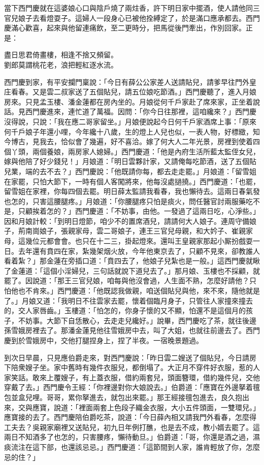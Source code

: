 當下西門慶就在這婆娘心口與陰戶燒了兩炷香，許下明日家中擺酒，使人請他同三官兒娘子去看燈耍子。這婦人一段身心已被他拴縛定了，於是滿口應承都去。西門慶滿心歡喜，起來與他留連痛飲，至二更時分，把馬從後門牽出，作別回家。正是：

\begin{myquote}
盡日思君倚畫樓，相逢不捨又頻留。\\劉郎莫謂桃花老，浪把輕紅逐水流。
\end{myquote}

西門慶到家，有平安攔門稟說：「今日有薛公公家差人送請貼兒，請爹早往門外皇庄看春。又是雲二叔家送了五個貼兒，請五位娘吃節酒。」西門慶聽了，進入月娘房來。只見孟玉樓、潘金蓮都在房內坐的。月娘從何千戶家赴了席來家，正坐着說話。見西門慶進來，連忙道了萬福。因問：「你今日往那裡，這咱纔來？」西門慶沒得說，只說：「我在應二哥家留坐。」月娘便說起今日何千戶家酒席上事：「原來何千戶娘子年還小哩，今年纔十八歲，生的燈上人兒也似，一表人物，好標緻，知今博古，見我去，恰似會了幾遍，好不喜洽。嫁了何大人二年光景，房裡到使着四個丫頭，兩個養娘，兩房家人媳婦。」西門慶道：「他是內府生活所藍太監侄女兒，嫁與他陪了好少錢兒！」月娘道：「明日雲夥計家，又請俺每吃節酒，送了五個貼兒業，端的去不去？」西門慶說：「他既請你每，都去走走罷。」月娘道：「留雪姐在家罷，只怕大節下，一時有個人客闖將來，他每沒處撾撓。」西門慶道：「也罷，留雪姐在家裡，你每四個去罷。明日薛太監請我看春，我也懶待去。這兩日春氣發也怎的，只害這腰腿疼。」月娘道：「你腰腿疼只怕是痰火，問任醫官討兩服藥吃不是，只顧挨着怎的？」西門慶道：「不妨事，由他。一發過了這兩日吃，心淨些。」因和月娘計較：「到明日燈節，咱少不的置席酒兒，請請何大人娘子。連周守備娘子，荊南崗娘子，張親家母，雲二哥娘子，連王三官兒母親，和大妗子、崔親家母，這幾位元都會會。也只在十二三，掛起燈來。還叫王皇親家那起小厮扮戲耍一日。去年還有賁四在家，紮幾架烟火放，今年他東京去了，只顧不見來，卻教誰人看着紮？」那金蓮在旁插口道：「賁四去了，他娘子兒紮也是一般。」{}這西門慶就瞅了金蓮道：「這個小淫婦兒，三句話就說下道兒去了。」那月娘、玉樓也不採顧，就罷了。因說道：「那王三官兒娘，咱每與他沒會過，人生面不熟，怎麼好請他？只怕他也不肯來。」西門慶道：「他既認我做親，咱送個貼兒與他，來不來，隨他就是了。」月娘又道：「我明日不往雲家去罷，懷着個臨月身子，只管往人家撞來撞去的，交人家唇齒。」玉樓道：「怕怎的，你身子懷的又不顯，怕還不是這個月的孩子，不妨事。大節下自恁散心，去走走兒纔好。」說畢，西門慶吃了茶，就往後邊孫雪娥房裡去了。那潘金蓮見他往雪娥房中去，叫了大姐，也就往前邊去了。西門慶到於雪娥房中，交他打腿捏身上，捏了半夜。{}一宿晚景題過。

到次日早晨，只見應伯爵走來，對西門慶說：「昨日雲二嫂送了個貼兒，今日請房下陪衆嫂子坐。家中舊時有幾件衣服兒，都倒塌了。大正月不穿件好衣服，惹的人家笑話。敢來上覆嫂子，有上蓋衣服，借約兩套兒，頭面簪環，借約幾件兒，交他穿戴了去。」西門慶令王經：「你裡邊對你大娘說去。」伯爵道：「應寶在外邊拏着氊包並盒兒哩。哥哥，累你拏進去，就包出來罷。」那王經接氊包進去，良久抱出來，交與應寶，說道：「裡面兩套上色段子織金衣服，大小五件頭面，一雙環兒。」{}應寶接的去了。西門慶陪伯爵吃茶，說道：「今日薛內相又請我門外看春，怎麼得工夫去？吳親家廟裡又送貼兒，初九日年例打醮，也是去不成，教小婿去罷了。這兩日不知酒多了也怎的，只害腰疼，懶待動旦。」伯爵道：「哥，你還是酒之過，濕痰流注在這下部，也還該忌忌。」西門慶道：「這節間到人家，誰肯輕放了你，怎麼忌的住？」

